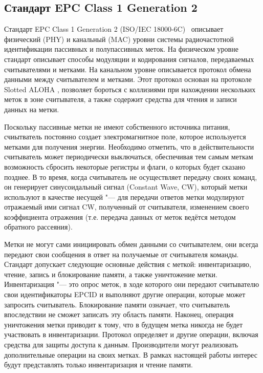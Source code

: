 \subsection{Стандарт EPC Class 1 Generation 2}\label{sec:ch1_rfid_std}

Стандарт EPC Class 1 Generation 2 (ISO/IEC 18000-6C)~\cite{StdGen2} описывает физический (PHY) и канальный (MAC) уровни системы радиочастотной идентификации пассивных и полупассивных меток. На физическом уровне стандарт описывает способы модуляции и кодирования сигналов, передаваемых считывателями и метками. На канальном уровне описывается протокол обмена данными между считывателем и метками. Этот протокол основан на протоколе Slotted ALOHA \cite{Abramson1970, Roberts1975}, позволяет бороться с коллизиями при нахождении нескольких меток в зоне считывателя, а также содержит средства для чтения и записи данных на метки.

Поскольку пассивные метки не имеют собственного источника питания, счиытватель постоянно создает электромагнитное поле, которое используется метками для получения энергии. Необходимо отметить, что в действительности считыватель может периодически выключаться, обеспечивая тем самым меткам возможность сбросить некоторые регистры и флаги, о которых будет сказано позднее. В то время, когда считыватель не осуществляет передачу своих команд, он генерирует синусоидальный сигнал (Constant Wave, CW), который метки используют в качестве несущей "--- для передачи ответов метки модулируют отражаемый ими сигнал CW, полученный от считывателя, изменением своего коэффициента отражения (т.е. передача данных от меток ведётся методом обратного рассеяния).

Метки не могут сами инициировать обмен данными со считывателем, они всегда передают свои сообщения в ответ на получаемые от считывателя команды. Стандарт допускает следующие основные действия с меткой: инвентаризацию, чтение, запись и блокирование памяти, а также уничтожение метки. Инвентаризация "--- это опрос меток, в ходе которого они передают считывателю свои идентификаторы EPCID и выполняют другие операции, которые может запросить считыватель.  Блокирование памяти означает, что считыватель впоследствии не сможет записать эту область памяти. Наконец, операция уничтожения метки приводит к тому, что в будущем метка никогда не будет участвовать в инвентаризации. Протокол определяет и другие операции, включая средства для защиты доступа к данным. Производители могут реализовать дополнительные операции на своих метках. В рамках настоящей работы интерес будут представлять только инвентаризация и чтение памяти.


